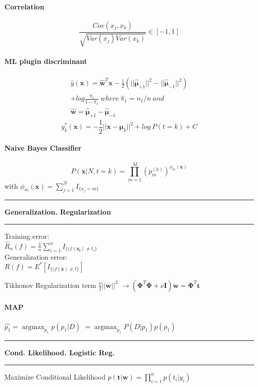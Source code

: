 \documentclass[7pt]{scrartcl}
\newlength{\secskip}
\renewcommand{\section}[1]{
  \vspace{\secskip}
  \hrule\vspace{.3em}
  \textbf{#1}
  \vspace{.3em}
  \hrule
  \vspace{\secskip}
}
\DeclareMathOperator*{\argmax}{argmax}
\renewcommand{\vec}{\mathbf}
\begin{document}
\begin{multicols}{4}
\paragraph{Correlation}
\[\frac{Cov(x_j,x_k)}{\sqrt{Var(x_j)Var(x_k)}} \in [-1,1]\]

\paragraph{ML plugin discriminant}
\begin{equation*}
\begin{split}
\hat{y}(\vec{x}) = \hat{\vec{w}}^T \vec{x} - \frac{1}{2}(||\hat{\vec{\mu}}_{+1} ||^2 - || \hat{\vec{\mu}}_{-1} ||^2) \\ + log\frac{\hat{\pi}_1}{1-\hat{\pi}_1} ~ where~ \hat{\pi}_1 = n_1 / n ~ and~  \\ \hat{\vec{w}}=\hat{\vec{\mu}}_{+1} - \hat{\vec{\mu}}_{-1}
\end{split}
\end{equation*}
\[y_k^*(\vec{x}) = -\frac{1}{2}||\vec{x}-\vec{\mu}_k||^2 + log~P(t=k) + C\]

\paragraph{Naive Bayes Classifier}
\[ P(\vec x | N,t=k) = \prod_{m=1}^M \left ( p_m^{(k)} \right
)^{\phi_m(\vec x)} \]
with $\phi_m(\vec x) = \sum_{j=1}^N I_{\{x_j = m\}}$

\section{Generalization. Regularization}
Training error: \\
$\hat{R}_n(f) = \frac{1}{n} \sum_{i=1}^n I_{\{(f(\vec{x_i}) \neq t_i\}}$ \\
Generalization error: \\
$R(f) = E^*[I_{\{(f(\vec{x}) \neq t\}}]$

Tikhonov Regularization term $\frac{\nu}{2} ||\vec{w}||^2$
$\rightarrow (\vec{\Phi}^T \vec{\Phi} + \nu \vec{I})\vec{w} = \vec{\Phi}^T \vec{t}$

\paragraph{MAP}
$\hat{p_1} = \argmax_{p_1} p(p_1|D)$
$= \argmax_{p_1} P(D|p_1)p(p_1)$
\section{Cond. Likelihood. Logistic Reg.}
Maximize Conditional Likelihood $p(\vec t|\vec w) = \prod_{i=1}^n p(t_i|y_i)$

\end{multicols}
\end{document}
